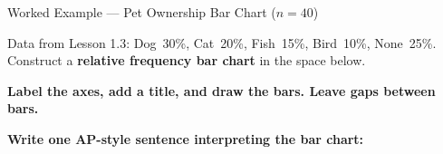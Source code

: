 \documentclass[10pt]{article}
\begin{document}
\begin{notesbox}{Worked Example --- Pet Ownership Bar Chart ($n = 40$)}
\small

\noindent Data from Lesson 1.3: Dog~30\%, Cat~20\%, Fish~15\%, Bird~10\%, None~25\%.
Construct a \textbf{relative frequency bar chart} in the space below.

\vspace{8pt}
\textbf{Label the axes, add a title, and draw the bars. Leave gaps between bars.}

\vspace{10pt}
\begin{tcolorbox}[colback=white, colframe=slate, boxrule=0.5pt, arc=2mm,
    left=3mm, right=3mm, top=3mm, bottom=3mm, height=2.2in]
\end{tcolorbox}

\vspace{10pt}
\textbf{Write one AP-style sentence interpreting the bar chart:}\\[6pt]
\writeline\\[1pt]\writeline

\end{notesbox}

\newpage
\end{document}
